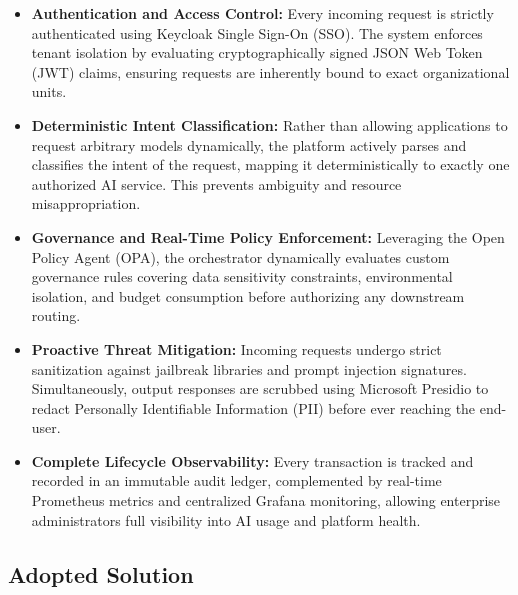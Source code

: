 \begin{itemize}[leftmargin=1.5cm]
    \item \textbf{Authentication and Access Control:} Every incoming request is strictly authenticated using Keycloak Single Sign-On (SSO). The system enforces tenant isolation by evaluating cryptographically signed JSON Web Token (JWT) claims, ensuring requests are inherently bound to exact organizational units.
    
    \item \textbf{Deterministic Intent Classification:} Rather than allowing applications to request arbitrary models dynamically, the platform actively parses and classifies the intent of the request, mapping it deterministically to exactly one authorized AI service. This prevents ambiguity and resource misappropriation.
    
    \item \textbf{Governance and Real-Time Policy Enforcement:} Leveraging the Open Policy Agent (OPA), the orchestrator dynamically evaluates custom governance rules covering data sensitivity constraints, environmental isolation, and budget consumption before authorizing any downstream routing.
    
    \item \textbf{Proactive Threat Mitigation:} Incoming requests undergo strict sanitization against jailbreak libraries and prompt injection signatures. Simultaneously, output responses are scrubbed using Microsoft Presidio to redact Personally Identifiable Information (PII) before ever reaching the end-user.
    
    \item \textbf{Complete Lifecycle Observability:} Every transaction is tracked and recorded in an immutable audit ledger, complemented by real-time Prometheus metrics and centralized Grafana monitoring, allowing enterprise administrators full visibility into AI usage and platform health.
\end{itemize}


\subsection{Adopted Solution}

